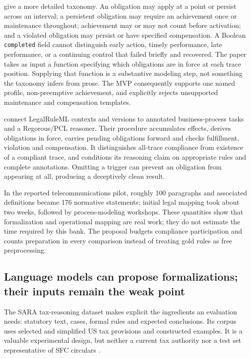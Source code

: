 \citet[sec.~3, Definitions 10--17]{normative2016} give a more detailed taxonomy.
An obligation may apply at a point or persist across an interval; a persistent
obligation may require an achievement once or maintenance throughout; achievement
may or may not count before activation; and a violated obligation may persist or
have specified compensation. A Boolean \texttt{completed} field cannot distinguish
early action, timely performance, late performance, or a continuing control that
failed briefly and recovered. The paper takes as input a function specifying
which obligations are in force at each trace position. Supplying that function
is a substantive modeling step, not something the taxonomy infers from prose.
The MVP consequently supports one named profile, non-preemptive achievement,
and explicitly rejects unsupported maintenance and compensation templates.

\citet[secs.~3--4]{semanticcompliance2016} connect LegalRuleML contexts and
versions to annotated business-process tasks and a Regorous/PCL reasoner. Their
procedure accumulates effects, derives obligations in force, carries pending
obligations forward and checks fulfillment, violation and compensation. It
distinguishes all-trace compliance from existence of a compliant trace, and
conditions its reasoning claim on appropriate rules and complete annotations.
Omitting a trigger can prevent an obligation from appearing at all, producing a
deceptively clean result.

In the reported telecommunications pilot, roughly 100 paragraphs and associated
definitions became 176 normative statements; initial legal mapping took about
two weeks, followed by process-modeling workshops. These quantities show that
formalization and operational mapping are real work; they do not estimate the
time required by this bank. The proposal budgets compliance participation and
counts preparation in every comparison instead of treating gold rules as free
preprocessing.

\subsection[Language models and the formalization boundary]{Language models can propose formalizations; their inputs remain the weak point}

The SARA tax-reasoning dataset makes explicit the ingredients an evaluation needs:
statutory text, cases, formal rules and expected conclusions. Its corpus uses
selected and simplified US tax provisions and constructed examples. It is a
valuable experimental design, but neither a current tax authority nor a test set
representative of SFC circulars \citep[secs.~2--3]{sara2020}.

